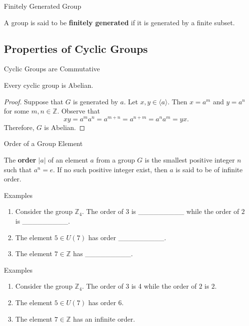 \documentclass{beamer}
\begin{document}
\begin{frame}{Finitely Generated Group}
\begin{definition}
A group is said to be \textbf{finitely generated} if it is generated by a finite subset.
\end{definition}
\end{frame}

\subsection{Properties of Cyclic Groups}

\begin{frame}{Cyclic Groups are Commutative}
\begin{theorem}
\justifying
Every cyclic group is Abelian.
\end{theorem}    
\pause
\begin{proof}
Suppose that $G$ is generated by $a$. Let $x, y \in \langle a\rangle$. Then $x = a^m$ and $y = a^n$ for some $m, n \in \mathbb{Z}$. Observe that
\[
xy = a^ma^n = a^{m + n} = a^{n + m} = a^na^m = yx.
\]
Therefore, $G$ is Abelian.
\end{proof}
\end{frame}

\begin{frame}{Order of a Group Element}
\begin{definition}
\justifying
The \textbf{order} $|a|$ of an element $a$ from a group $G$ is the smallest positive integer $n$ such that $a^n = e$. If no such positive integer exist, then $a$ is said to be of infinite order.
\end{definition}
\end{frame}

\begin{frame}{Examples}
\begin{enumerate}
\item Consider the group $\mathbb{Z}_4$. The order of $3$ is \_\_\_\_\_\_\_\_\_ while the order of $2$ is \_\_\_\_\_\_\_\_\_.
\item The element $5 \in U(7)$ has order \_\_\_\_\_\_\_\_\_.
\item The element $7 \in \mathbb{Z}$ has \_\_\_\_\_\_\_\_\_. 
\end{enumerate}    
\end{frame}

\begin{frame}{Examples}
\begin{enumerate}
\item Consider the group $\mathbb{Z}_4$. The order of $3$ is 4 while the order of $2$ is $2$.
\pause
\item The element $5 \in U(7)$ has order $6$.
\pause
\item The element $7 \in \mathbb{Z}$ has an infinite order. 
\end{enumerate}    
\end{frame}
\end{document}
